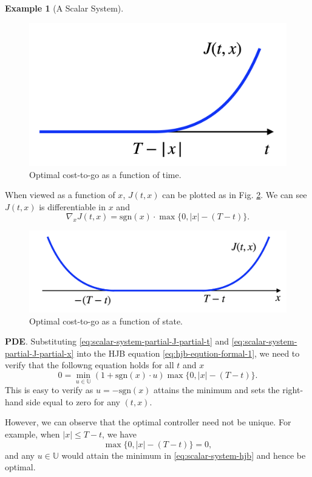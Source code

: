 \documentclass[
]{book}
\theoremstyle{definition}
\theoremstyle{definition}
\newtheorem{example}{Example}[chapter]
\theoremstyle{definition}
\theoremstyle{definition}
\theoremstyle{remark}
\begin{document}
\begin{example}[A Scalar System]
\begin{figure}

{\centering \includegraphics[width=0.5\linewidth]{images/scalar-system-optimal-J-t} 

}

\caption{Optimal cost-to-go as a function of time.}\label{fig:scalar-system-optimal-J-t}
\end{figure}

When viewed as a function of \(x\), \(J(t,x)\) can be plotted as in Fig. \ref{fig:scalar-system-optimal-J-x}. We can see \(J(t,x)\) is differentiable in \(x\) and
\begin{equation}
\nabla_x J(t,x) = \text{sgn}(x) \cdot \max\{ 0,|x| - (T-t) \}.
\label{eq:scalar-system-partial-J-partial-x}
\end{equation}

\begin{figure}

{\centering \includegraphics[width=0.6\linewidth]{images/scalar-system-optimal-J-x} 

}

\caption{Optimal cost-to-go as a function of state.}\label{fig:scalar-system-optimal-J-x}
\end{figure}

\textbf{PDE}. Substituting \eqref{eq:scalar-system-partial-J-partial-t} and \eqref{eq:scalar-system-partial-J-partial-x} into the HJB equation \eqref{eq:hjb-eqution-formal-1}, we need to verify that the followng equation holds for all \(t\) and \(x\)
\begin{equation}
0 = \min_{u \in \mathbb{U}} (1 + \text{sgn}(x) \cdot u) \max\{0, |x| - (T-t) \}.
\label{eq:scalar-system-hjb}
\end{equation}
This is easy to verify as \(u = - \text{sgn}(x)\) attains the minimum and sets the right-hand side equal to zero for any \((t,x)\).

However, we can observe that the optimal controller need not be unique. For example, when \(|x| \leq T-t\), we have
\[
\max\{0, |x| - (T-t) \} = 0,
\]
and any \(u \in \mathbb{U}\) would attain the minimum in \eqref{eq:scalar-system-hjb} and hence be optimal.
\end{example}
\end{document}
